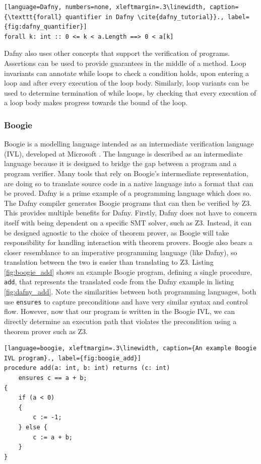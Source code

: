 \begin{lstlisting}[language=Dafny, numbers=none, xleftmargin=.3\linewidth, caption={\texttt{forall} quantifier in Dafny \cite{dafny_tutorial}}., label={fig:dafny_quantifier}]
forall k: int :: 0 <= k < a.Length ==> 0 < a[k]
\end{lstlisting}
Dafny also uses other concepts that support the verification of programs. Assertions can be used to provide guarantees in the middle of a method. Loop invariants can annotate while loops to check a condition holds, upon entering a loop and after every execution of the loop body. Similarly, loop variants can be used to determine termination of while loops, by checking that every execution of a loop body makes progress towards the bound of the loop.
\subsubsection{Boogie}
Boogie is a modelling language intended as an intermediate verification language (IVL), developed at Microsoft \cite{boogie}. The language is described as an intermediate language because it is designed to bridge the gap between a program and a program verifier. Many tools that rely on Boogie's intermediate representation, are doing so to translate source code in a native language into a format that can be proved. Dafny is a prime example of a programming language which does so. The Dafny compiler generates Boogie programs that can then be verified by Z3. This provides multiple benefits for Dafny. Firstly, Dafny does not have to concern itself with being dependent on a specific SMT solver, such as Z3. Instead, it can be designed agnostic to the choice of theorem prover, as Boogie will take responsibility for handling interaction with theorem provers. Boogie also bears a closer resemblance to an imperative programming language (like Dafny), so translation between the two is easier than translating to Z3. Listing \ref{fig:boogie_add} shows an example Boogie program, defining a single procedure, \texttt{add}, that represents the translated code from the Dafny example in listing \ref{fig:dafny_add}. Note the similarities between both programming languages, both use \texttt{ensures} to capture preconditions and have very similar syntax and control flow. However, now that our program is written in the Boogie IVL, we can directly determine an execution path that violates the precondition using a theorem prover such as Z3.
\begin{lstlisting}[language=boogie, xleftmargin=.3\linewidth, caption={An example Boogie IVL program}., label={fig:boogie_add}]
procedure add(a: int, b: int) returns (c: int)
    ensures c == a + b;
{
    if (a < 0) 
    {
        c := -1;
    } else {
        c := a + b;
    }
}
\end{lstlisting}

